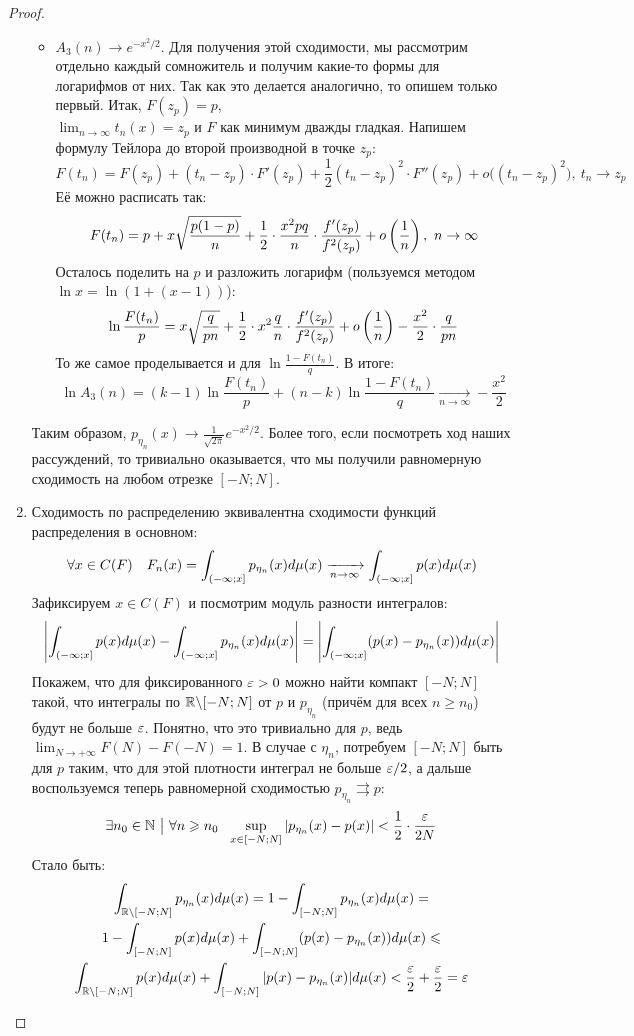 \begin{proof}
\begin{enumerate}
\begin{itemize}
			\item $A_3(n) \to e^{-x^2 / 2}$. Для получения этой сходимости, мы рассмотрим отдельно каждый сомножитель и получим какие-то формы для логарифмов от них. Так как это делается аналогично, то опишем только первый. Итак, $F(z_p) = p$,\\ $\lim_{n \to \infty} t_n(x) = z_p$ и $F$ как минимум дважды гладкая. Напишем формулу Тейлора до второй производной в точке $z_p$:
			\[
				F(t_n) = F(z_p) + (t_n - z_p) \cdot F'(z_p) + \frac{1}{2}(t_n - z_p)^2 \cdot F''(z_p) + o\big((t_n - z_p)^2\big),\ t_n \to z_p
			\]
			Её можно расписать так:
			\[
				F(t_n) = p + x\sqrt{\frac{p(1 - p)}{n}} + \frac{1}{2} \cdot \frac{x^2pq}{n} \cdot \frac{f'(z_p)}{f^2(z_p)} + o\left(\frac{1}{n}\right),\ n \to \infty
			\]
			Осталось поделить на $p$ и разложить логарифм (пользуемся методом $\ln x = \ln(1 + (x - 1))$):
			\[
				\ln \frac{F(t_n)}{p} = x\sqrt{\frac{q}{pn}} + \frac{1}{2} \cdot x^2\frac{q}{n} \cdot \frac{f'(z_p)}{f^2(z_p)} + o\left(\frac{1}{n}\right) - \frac{x^2}{2} \cdot \frac{q}{pn}
			\]
			То же самое проделывается и для $\ln \frac{1 - F(t_n)}{q}$. В итоге:
			\[
				\ln A_3(n) = (k - 1)\ln \frac{F(t_n)}{p} + (n - k)\ln \frac{1 - F(t_n)}{q} \xrightarrow[n \to \infty]{} -\frac{x^2}{2}
			\]
		\end{itemize}
		Таким образом, $p_{\eta_n}(x) \to \frac{1}{\sqrt{2\pi}} e^{-x^2 / 2}$. Более того, если посмотреть ход наших рассуждений, то тривиально оказывается, что мы получили равномерную сходимость на любом отрезке $[-N; N]$.
		
		\item Сходимость по распределению эквивалентна сходимости функций распределения в основном:
		\[
			\forall x \in C(F)\quad F_n(x) = \int_{\left(-\infty; x\right]} p_{\eta_n}(x)d\mu(x) \xrightarrow[n \to \infty]{} \int_{\left(-\infty; x\right]} p(x)d\mu(x)
		\]
		Зафиксируем $x \in C(F)$ и посмотрим модуль разности интегралов:
		\[
			\left|\int_{\left(-\infty; x\right]} p(x)d\mu(x) - \int_{\left(-\infty; x\right]} p_{\eta_n}(x)d\mu(x)\right| = \left|\int_{\left(-\infty; x\right]} (p(x) - p_{\eta_n}(x))d\mu(x)\right|
		\]
		Покажем, что для фиксированного $\varepsilon > 0$ можно найти компакт $[-N; N]$ такой, что интегралы по $\mathbb{R} \backslash [-N; N]$ от $p$ и $p_{\eta_n}$ (причём для всех $n \ge n_0$) будут не больше $\varepsilon$. Понятно, что это тривиально для $p$, ведь $\lim_{N \to +\infty} F(N) - F(-N) = 1$. В случае с $\eta_n$, потребуем $[-N; N]$ быть для $p$ таким, что для этой плотности интеграл не больше $\varepsilon / 2$, а дальше воспользуемся теперь равномерной сходимостью $p_{\eta_n} \rightrightarrows p$:
		\[
			\exists n_0 \in \N \such \forall n \ge n_0\ \ \sup_{x \in [-N; N]} |p_{\eta_n}(x) - p(x)| < \frac{1}{2} \cdot \frac{\eps}{2N}
		\]
		Стало быть:
		\begin{multline*}
			\int_{\mathbb{R} \backslash [-N; N]} p_{\eta_n}(x)d\mu(x) = 1 - \int_{[-N; N]} p_{\eta_n}(x)d\mu(x) =
			\\
			1 - \int_{[-N; N]} p(x)d\mu(x) + \int_{[-N; N]} (p(x) - p_{\eta_n}(x))d\mu(x) \leqslant
			\\
			\int_{\mathbb{R} \backslash [-N; N]} p(x)d\mu(x) + \int_{[-N; N]} |p(x) - p_{\eta_n}(x)|d\mu(x) < \frac{\varepsilon}{2} + \frac{\varepsilon}{2} = \varepsilon
		\end{multline*}
		

\end{enumerate}
\end{proof}
